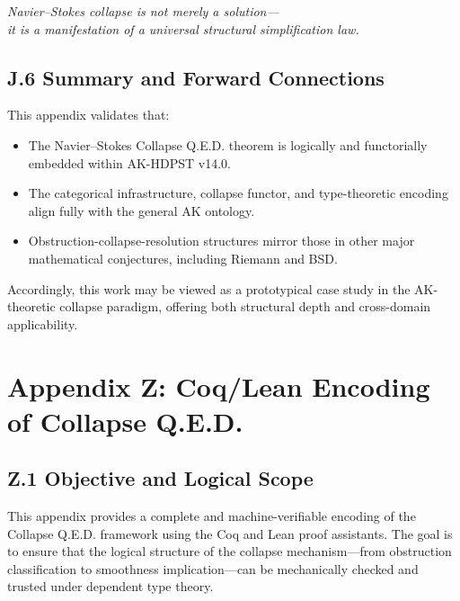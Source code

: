 \documentclass[11pt]{article}
\begin{document}
\begin{center}
\textit{Navier--Stokes collapse is not merely a solution—\\
it is a manifestation of a universal structural simplification law.}
\end{center}

\subsection*{J.6 Summary and Forward Connections}

This appendix validates that:

\begin{itemize}
  \item The Navier--Stokes Collapse Q.E.D. theorem is logically and functorially embedded within AK-HDPST v14.0.
  \item The categorical infrastructure, collapse functor, and type-theoretic encoding align fully with the general AK ontology.
  \item Obstruction-collapse-resolution structures mirror those in other major mathematical conjectures, including Riemann and BSD.
\end{itemize}

Accordingly, this work may be viewed as a prototypical case study in the AK-theoretic collapse paradigm, offering both structural depth and cross-domain applicability.




\appendix
\section*{Appendix Z: \texorpdfstring{Coq/Lean Encoding of Collapse Q.E.D.}{Coq/Lean Encoding of Collapse Q.E.D.}}

\subsection*{Z.1 Objective and Logical Scope}

This appendix provides a complete and machine-verifiable encoding of the Collapse Q.E.D. framework using the Coq and Lean proof assistants. The goal is to ensure that the logical structure of the collapse mechanism---from obstruction classification to smoothness implication---can be mechanically checked and trusted under dependent type theory.
\end{document}

